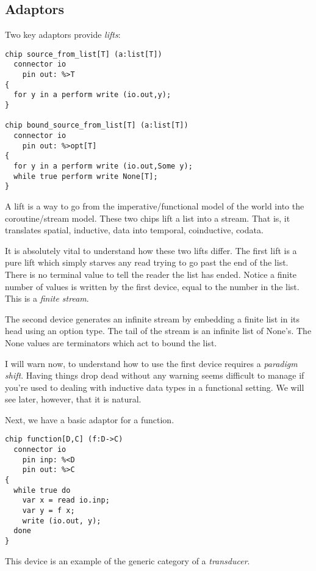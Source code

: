 \documentclass[oneside]{book}
\begin{document}
\subsection{Adaptors}
Two key adaptors provide {\em lifts}:


\begin{verbatim}
chip source_from_list[T] (a:list[T])
  connector io
    pin out: %>T
{
  for y in a perform write (io.out,y);
}

chip bound_source_from_list[T] (a:list[T])
  connector io
    pin out: %>opt[T]
{
  for y in a perform write (io.out,Some y);
  while true perform write None[T];
}
\end{verbatim}

A lift is a way to go from the imperative/functional model
of the world into the coroutine/stream model. These
two chips lift a list into a stream. That is, it translates
spatial, inductive, data into temporal, coinductive, codata.

It is absolutely vital to understand how these two
lifts differ. The first lift is a pure lift
which simply starves any read trying to go past the
end of the list. There is no terminal value to tell the
reader the list has ended. Notice a finite number
of values is written by the first device, equal to the
number in the list. This is a {\em finite stream}.

The second device generates an infinite stream
by embedding a finite list in its head using 
an option type. The tail of the stream is an infinite
list of None's. The None values are terminators which
act to bound the list.

I will warn now, to understand how to use the first device
requires a {\em paradigm shift}. Having things drop dead without
any warning seems difficult to manage if you're used
to dealing with inductive data types in a functional
setting. We will see later, however, that it is natural.

Next, we have a basic adaptor for a function.

\begin{verbatim}
chip function[D,C] (f:D->C)
  connector io
    pin inp: %<D
    pin out: %>C
{
  while true do
    var x = read io.inp;
    var y = f x; 
    write (io.out, y);
  done
}
\end{verbatim}


This device is an example of the generic category 
of a {\em transducer}.  
\end{document}
